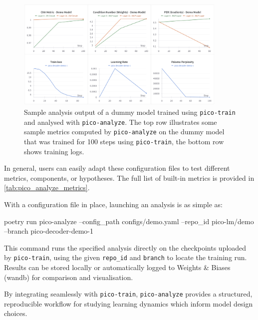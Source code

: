 \begin{figure}[t]
    \centering
    \includegraphics[width=0.9\textwidth]{chapters/pico/figures/demo_full_run.png}
    \caption{Sample analysis output of a dummy model trained using \texttt{pico-train} and analysed with \texttt{pico-analyze}. The top row illustrates some sample metrics computed by \texttt{pico-analyze} on the dummy model that was trained for 100 steps using \texttt{pico-train}, the bottom row shows training logs.}
    \label{fig:demo_full_run}
\end{figure}

In general, users can easily adapt these configuration files to test different metrics, components, or hypotheses. The full list of built-in metrics is provided in \cref{tab:pico_analyze_metrics}.

With a configuration file in place, launching an analysis is as simple as:

\begin{center}
    \begin{codelisting}
    poetry run pico-analyze
        --config_path configs/demo.yaml
        --repo_id pico-lm/demo
        --branch pico-decoder-demo-1
    \end{codelisting}
\end{center}

This command runs the specified analysis directly on the checkpoints uploaded by \texttt{pico-train}, using the given \verb|repo_id| and \verb|branch| to locate the training run. Results can be stored locally or automatically logged to Weights \& Biases (wandb) \citep{wandb} for comparison and visualisation.

By integrating seamlessly with \texttt{pico-train}, \texttt{pico-analyze} provides a structured, reproducible workflow for studying learning dynamics which inform model design choices.

